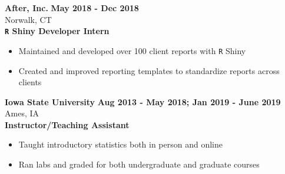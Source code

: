\documentclass{article}
\newenvironment{innerlist}[1][\enskip\textbullet]%
        {\begin{itemize}[#1,leftmargin=*,parsep=0pt,itemsep=0pt,topsep=0pt,partopsep=0pt]}
        {\end{itemize}}
\begin{document}
\textbf{After, Inc.} \hfill {\textbf{May 2018 - Dec 2018}} \\
Norwalk, CT\\
\textbf{\texttt{R} Shiny Developer Intern}
\begin{innerlist}
  \item Maintained and developed over 100 client reports with \verb|R| Shiny
  \item Created and improved reporting templates to standardize reports across clients \\
\end{innerlist}

\textbf{Iowa State University} \hfill {\textbf{Aug 2013 - May 2018; Jan 2019 - June 2019}} \\
Ames, IA \\
\textbf{Instructor/Teaching Assistant}
\begin{innerlist}
  \item Taught introductory statistics both in person and online 
  \item Ran labs and graded for both undergraduate and graduate courses 
\end{innerlist}
\end{document}
